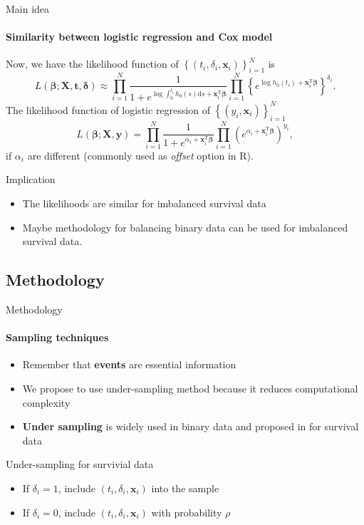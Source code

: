\documentclass{beamer}
\newcommand{\red}{\color{red}}
\newcommand{\blue}{\color{blue}}
\newcommand{\bbeta}{\bm{\beta}}
\newcommand{\x}{\bm{x}}
\newcommand{\X}{\bm{X}}
\newcommand{\y}{\bm{y}}
\newcommand{\tp}{^{\mathrm{T}}}
\newcommand{\bdelta}{\bm{\delta}}
\newcommand{\bt}{\bm{t}}
\begin{document}
    \begin{frame}{Main idea}
    \framesubtitle{Similarity between logistic regression and Cox model}
    Now, we have the likelihood function of $\left\{(t_i,\delta_i,\x_i)\right\}_{i=1}^{N}$ is
    \begin{equation*}
        L(\bbeta;\X,\bt,\bdelta)\approx
        \prod_{i=1}^N \frac{1}{1+e^{\log\int_{0}^{t_i}h_0(s)\mathrm{d}s+\x_i\tp\bbeta}}
            \prod_{i=1}^N\left\{e^{\log h_0(t_i)+\x_i\tp\bbeta}\right\}^{\delta_i}.
    \end{equation*}
        The likelihood function of logistic regression of $\left\{(y_i,\x_i)\right\}_{i=1}^{N}$
        \begin{equation*}
            L(\bbeta;\X,\y)=\prod_{i=1}^{N}\frac{1}{1+e^{\alpha_i+\x_i\tp\bbeta}}\prod_{i=1}^N\left(e^{\alpha_i+\x_i\tp\bbeta}\right)^{y_i},
        \end{equation*}
    if $\alpha_i$ are different (commonly used as \textit{offset} option in R).
    \begin{block}{Implication}
    \begin{itemize}
        \item The likelihoods are similar for {\blue imbalanced survival data}
        \item Maybe methodology for {\blue balancing binary data} can be used for {\blue imbalanced survival data}.
    \end{itemize}
    \end{block}
    \end{frame}

    \subsection{Methodology}
    \begin{frame}{Methodology}
    \framesubtitle{Sampling techniques}
    \begin{itemize}
        \item Remember that {\red\textbf{events}} are essential information
        \item We propose to use under-sampling method because it reduces computational complexity
        \item {\blue\textbf{Under sampling}} is widely used in {\blue binary data} and proposed in \cite{nir2023analyzing} for {\blue survival data}
    \end{itemize}
    \begin{exampleblock}{Under-sampling for survivial data}
        \begin{itemize}
            \item If $\delta_i=1$, include $(t_i, \delta_i, \x_i)$ into the sample
            \item If $\delta_i=0$, include $(t_i, \delta_i, \x_i)$ with probability $\rho$
        \end{itemize}
    \end{exampleblock}
    \end{frame}
\end{document}
